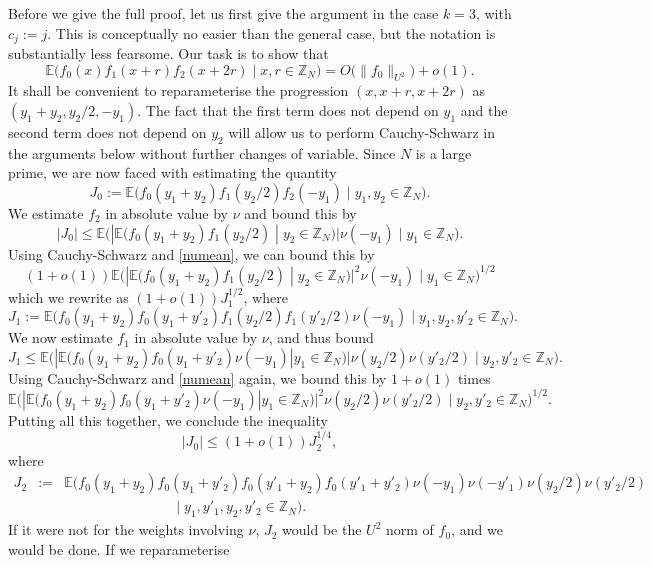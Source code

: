 \documentclass[12pt,a4paper,reqno]{amsart}
\numberwithin{equation}{section}
\theoremstyle{plain}
\theoremstyle{definition}
\renewcommand{\leq}{\leqslant}
\def\Z{{\mathbb Z}}
\def\E{{\mathbb E}}
\def\ni{\noindent}
\begin{document}
\ni Before we give the full proof, let us first give the argument in the case
$k=3$, with $c_j := j$. This is conceptually no easier than the general case, but the notation is substantially less fearsome.
Our task is to show that  
$$\E\big( f_0(x) f_1(x+r) f_2(x+2r) \;  \big| \; x,r \in \mathbb{Z}_N \big) = O\big( \| f_0 \|_{U^2} \big) + o(1).$$
It shall be convenient to reparameterise the progression $(x,x+r,x+2r)$ as $(y_1+y_2, y_2/2, -y_1)$. The fact that the first term does not depend on $y_1$ and the second term does not depend on $y_2$ will allow us to perform
Cauchy-Schwarz in the arguments below without further changes of variable.  
Since $N$ is a large prime, we are now faced with estimating the quantity
\begin{equation}\label{j0-def}
J_0 := \E\big( f_0(y_1+y_2) f_1(y_2/2) f_2(-y_1) \;  \big| \; y_1,y_2 \in \mathbb{Z}_N \big).
\end{equation}
We estimate $f_2$ in absolute value by $\nu$ and bound this by
$$ |J_0| \leq \E\big( |\E(f_0(y_1+y_2) f_1(y_2/2)\; | \; y_2 \in \Z_N)| \nu(-y_1) \;  \big| \; y_1 \in \mathbb{Z}_N \big).$$
Using Cauchy-Schwarz and \eqref{numean}, we can bound this by
$$ (1 + o(1)) \E\big( |\E(f_0(y_1+y_2) f_1(y_2/2)\; | \; y_2 \in \Z_N)|^2 \nu(-y_1) \;  \big| \; y_1 \in \mathbb{Z}_N \big)^{1/2}$$
which we rewrite as $(1 + o(1)) J_1^{1/2}$, where
$$ J_1 := \E\big( f_0(y_1+y_2) f_0(y_1+y'_2) f_1(y_2/2) f_1(y'_2/2) \nu(-y_1) \;  \big| \; y_1,y_2,y'_2 \in \mathbb{Z}_N \big).$$
We now estimate $f_1$ in absolute value by $\nu$, and thus bound \[
J_1 \leq  \E\big( |\E( f_0(y_1+y_2) f_0(y_1+y'_2) \nu(-y_1) | y_1 \in \Z_N )| \nu(y_2/2) \nu(y'_2/2) \;  \big| \; y_2,y'_2 \in \mathbb{Z}_N \big).
\]
Using Cauchy-Schwarz and \eqref{numean} again, we bound this by $1 + o(1)$ times
$$ \E\big( |\E( f_0(y_1+y_2) f_0(y_1+y'_2) \nu(-y_1) | y_1 \in \Z_N )|^2 \nu(y_2/2) \nu(y'_2/2) \;  \big| \; y_2,y'_2 \in \mathbb{Z}_N \big)^{1/2}.$$
Putting all this together, we conclude the inequality
\begin{equation}\label{jojo}
 |J_0| \leq (1 + o(1)) J_2^{1/4},
\end{equation}
where
\begin{eqnarray*}  J_2  & := & \E\big( f_0(y_1+y_2) f_0(y_1+y'_2) f_0(y'_1+y_2) f_0(y'_1+y'_2) \nu(-y_1) \nu(-y'_1) \nu(y_2/2) \nu(y'_2/2) \; \\ & & \qquad\qquad\qquad\qquad \big| \; 
y_1,y'_1,y_2,y'_2 \in \mathbb{Z}_N \big).\end{eqnarray*}
If it were not for the weights involving $\nu$, $J_2$ would be the $U^2$ norm of $f_0$, and we would be done.  If we reparameterise
\end{document}
